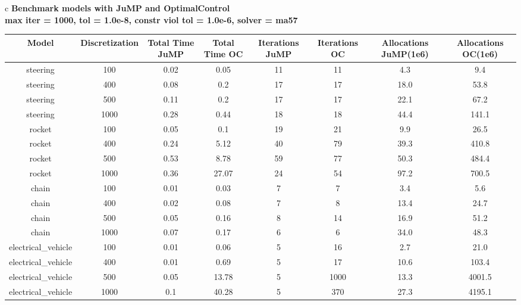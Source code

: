 \documentclass{standalone}
\begin{document}
\begin{tabular}{c}
\Large\textbf{Benchmark models with JuMP and OptimalControl}\\
\large\textbf{max iter = 1000, tol = 1.0e-8, constr viol tol = 1.0e-6, solver = ma57}\\
\begin{tabular}{cccccccc}
  \hline
  \textbf{Model} & \textbf{Discretization} & \textbf{Total Time JuMP} & \textbf{Total Time OC} & \textbf{Iterations JuMP} & \textbf{Iterations OC} & \textbf{Allocations JuMP(1e6)} & \textbf{Allocations OC(1e6)} \\\hline
  steering & 100 & 0.02 & 0.05 & 11 & 11 & 4.3 & 9.4 \\
  steering & 400 & 0.08 & 0.2 & 17 & 17 & 18.0 & 53.8 \\
  steering & 500 & 0.11 & 0.2 & 17 & 17 & 22.1 & 67.2 \\
  steering & 1000 & 0.28 & 0.44 & 18 & 18 & 44.4 & 141.1 \\
  rocket & 100 & 0.05 & 0.1 & 19 & 21 & 9.9 & 26.5 \\
  rocket & 400 & 0.24 & 5.12 & 40 & 79 & 39.3 & 410.8 \\
  rocket & 500 & 0.53 & 8.78 & 59 & 77 & 50.3 & 484.4 \\
  rocket & 1000 & 0.36 & 27.07 & 24 & 54 & 97.2 & 700.5 \\
  chain & 100 & 0.01 & 0.03 & 7 & 7 & 3.4 & 5.6 \\
  chain & 400 & 0.02 & 0.08 & 7 & 8 & 13.4 & 24.7 \\
  chain & 500 & 0.05 & 0.16 & 8 & 14 & 16.9 & 51.2 \\
  chain & 1000 & 0.07 & 0.17 & 6 & 6 & 34.0 & 48.3 \\
  electrical\_vehicle & 100 & 0.01 & 0.06 & 5 & 16 & 2.7 & 21.0 \\
  electrical\_vehicle & 400 & 0.01 & 0.69 & 5 & 17 & 10.6 & 103.4 \\
  electrical\_vehicle & 500 & 0.05 & 13.78 & 5 & 1000 & 13.3 & 4001.5 \\
  electrical\_vehicle & 1000 & 0.1 & 40.28 & 5 & 370 & 27.3 & 4195.1 \\\hline
\end{tabular}
\end{tabular}
\end{document}
